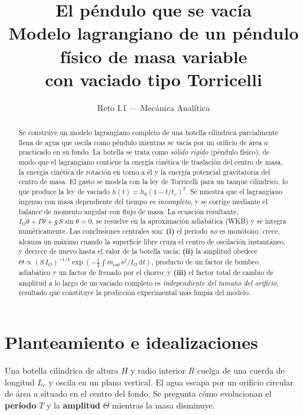 \documentclass[11pt,a4paper]{article}
\title{\vspace{-1.2cm}\textbf{El péndulo que se vacía}\\[2mm]
\large Modelo lagrangiano de un péndulo físico de masa variable\\
\large con vaciado tipo Torricelli}
\author{Reto I.1 --- Mecánica Analítica}
\date{}
\newcommand{\dd}{\mathrm{d}}
\begin{document}
\maketitle

\begin{abstract}
\noindent
Se construye un modelo lagrangiano completo de una botella cilíndrica parcialmente llena de agua
que oscila como péndulo mientras se vacía por un orificio de área $a$ practicado en su fondo.
La botella se trata como \emph{sólido rígido} (péndulo físico), de modo que el lagrangiano contiene
la energía cinética de traslación del centro de masa, la energía cinética de rotación en torno a él
y la energía potencial gravitatoria del centro de masa. El gasto se modela con la ley de Torricelli
para un tanque cilíndrico, lo que produce la ley de vaciado $h(t)=h_0(1-t/t_v)^2$.
Se muestra que el lagrangiano ingenuo con masa dependiente del tiempo es \emph{incompleto}, y se
corrige mediante el balance de momento angular con flujo de masa. La ecuación resultante,
$I_O\ddot\theta+\Gamma\dot\theta+g\,S\sin\theta=0$, se resuelve en la aproximación adiabática (WKB)
y se integra numéricamente. Las conclusiones centrales son: \textbf{(i)} el período
\emph{no} es monótono: crece, alcanza un máximo cuando la superficie libre cruza el centro de
oscilación instantáneo, y decrece de nuevo hasta el valor de la botella vacía; \textbf{(ii)} la
amplitud obedece $\Theta\propto (S\,I_O)^{-1/4}\exp(-\tfrac12\!\int\!\dot m_{\text{out}}s^2/I_O\,\dd t)$,
producto de un factor de bombeo adiabático y un factor de frenado por el chorro; y \textbf{(iii)} el
factor total de cambio de amplitud a lo largo de un vaciado completo es \emph{independiente del
tamaño del orificio}, resultado que constituye la predicción experimental más limpia del modelo.
\end{abstract}

\tableofcontents
\bigskip

\section{Planteamiento e idealizaciones}

Una botella cilíndrica de altura $H$ y radio interior $R$ cuelga de una cuerda de longitud $L_c$
y oscila en un plano vertical. El agua escapa por un orificio circular de área $a$ situado en el
centro del fondo. Se pregunta cómo evolucionan el \textbf{período} $T$ y la \textbf{amplitud}
$\Theta$ mientras la masa disminuye.
\end{document}
